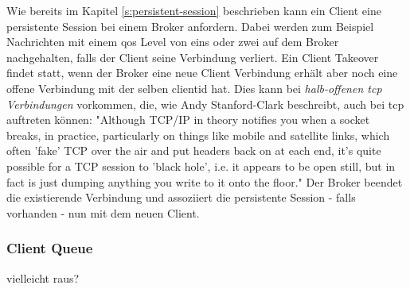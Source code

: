  \label{s:client-takeover}
Wie bereits im Kapitel \ref{s:persistent-session} beschrieben kann ein Client eine persistente Session bei einem Broker anfordern. Dabei werden zum Beispiel Nachrichten mit einem \ac{qos} Level von eins oder zwei auf dem Broker nachgehalten, falls der Client seine Verbindung verliert. Ein Client Takeover findet statt, wenn der Broker eine neue Client Verbindung erhält aber noch eine offene Verbindung mit der selben \ac{clientid} hat. Dies kann bei \textit{halb-offenen \acs{tcp} Verbindungen} vorkommen, die, wie Andy Stanford-Clark beschreibt, auch bei \ac{tcp} auftreten können:
"Although TCP/IP in theory notifies you when a socket breaks, in practice, particularly on things like mobile and satellite links, which often 'fake' TCP over the air and put headers back on at each end, it’s quite possible for a TCP session to 'black hole', i.e. it appears to be open still, but in fact is just dumping anything you write to it onto the floor."
Der Broker beendet die existierende Verbindung und assoziiert die persistente Session - falls vorhanden - nun mit dem neuen Client.
\cite{teamKeepAliveClient}

\subsubsection{Client Queue}
vielleicht raus?

